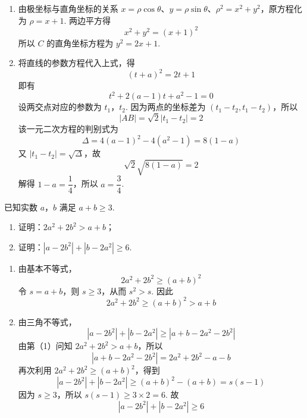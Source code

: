 \begin{solution}
\begin{enumerate}
\item 由极坐标与直角坐标的关系 \(x=\rho\cos\theta\)、\(y=\rho\sin\theta\)、\(\rho^2=x^2+y^2\)，原方程化为 \(\rho=x+1\). 两边平方得
\[
x^2+y^2=(x+1)^2
\]
所以 \(C\) 的直角坐标方程为 \(y^2=2x+1\).
\item 将直线的参数方程代入上式，得
\[
(t+a)^2=2t+1
\]
即有
\[
t^2+2(a-1)t+a^2-1=0
\]
设两交点对应的参数为 \(t_1\)，\(t_2\). 因为两点的坐标差为 \((t_1-t_2,t_1-t_2)\)，所以
\[
|AB|=\sqrt2|t_1-t_2|=2
\]
该一元二次方程的判别式为
\[
\Delta=4(a-1)^2-4(a^2-1)=8(1-a)
\]
又 \(|t_1-t_2|=\sqrt\Delta\)，故
\[
\sqrt2\sqrt{8(1-a)}=2
\]
解得 \(1-a=\dfrac14\)，所以 \(a=\dfrac34\).
\end{enumerate}
\end{solution}

\begin{problem}
已知实数 \(a\)，\(b\) 满足 \(a+b\ge3\).
\begin{enumerate}
\item 证明：\(2a^2+2b^2>a+b\)；
\item 证明：\(|a-2b^2|+|b-2a^2|\ge6\).
\end{enumerate}
\end{problem}

\begin{solution}
\begin{enumerate}
\item 由基本不等式，
\[
2a^2+2b^2\ge(a+b)^2
\]
令 \(s=a+b\)，则 \(s\ge3\)，从而 \(s^2>s\). 因此
\[
2a^2+2b^2\ge(a+b)^2>a+b
\]
\item 由三角不等式，
\[
|a-2b^2|+|b-2a^2|\ge\left|a+b-2a^2-2b^2\right|
\]
由第（1）问知 \(2a^2+2b^2>a+b\)，所以
\[
\left|a+b-2a^2-2b^2\right|=2a^2+2b^2-a-b
\]
再次利用 \(2a^2+2b^2\ge(a+b)^2\)，得到
\[
|a-2b^2|+|b-2a^2|\ge(a+b)^2-(a+b)=s(s-1)
\]
因为 \(s\ge3\)，所以 \(s(s-1)\ge3\times2=6\). 故
\[
|a-2b^2|+|b-2a^2|\ge6
\]
\end{enumerate}
\end{solution}

